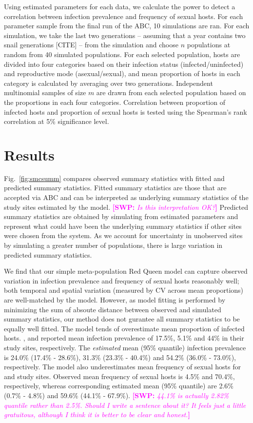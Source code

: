 \documentclass{article}\usepackage[]{graphicx}\usepackage[]{color}
\newcommand{\comment}[3]{\textcolor{#1}{\textbf{[#2: }\textit{#3}\textbf{]}}}
\newcommand{\swp}[1]{\comment{magenta}{SWP}{#1}}
\newcommand{\fref}[1]{Fig.~\ref{fig:#1}}
\begin{document}
Using estimated parameters for each data, we calculate the power to detect a correlation between infection prevalence and frequency of sexual hosts.
For each parameter sample from the final run of the ABC, 10 simulations are ran.
For each simulation, we take the last two generations -- assuming that a year contains two snail generations [CITE] -- from the simulation and choose $n$ populations at random from 40 simulated populations.
For each selected population, hosts are divided into four categories based on their infection status (infected/uninfected) and reproductive mode (asexual/sexual),
and mean proportion of hosts in each category is calculated by averaging over two generations.
Independent multinomial samples of size $m$ are drawn from each selected population based on the proportions  in each four categories. 
Correlation between proportion of infected hosts and proportion of sexual hosts is tested using the Spearman's rank correlation at 5\% significance level.

\section{Results}

\fref{smcsumm} compares observed summary statistics with fitted and predicted summary statistics.
Fitted summary statistics are those that are accepted via ABC and can be interpreted as underlying summary statistics of the study sites estimated by the model. \swp{Is this interpretation OK?}
Predicted summary statistics are obtained by simulating from estimated parameters and represent what could have been the underlying summary statistics if other sites were chosen from the system.
As we account for uncertainty in unobserved sites by simulating a greater number of populations, there is large variation in predicted summary statistics.

We find that our simple meta-population Red Queen model can capture observed variation in infection prevalence and frequency of sexual hosts reasonably well;
both temporal and spatial variation (measured by CV across mean proportions) are well-matched by the model. 
However, as model fitting is performed by minimizing the sum of absoute distance between observed and simulated summary statistics, our method does not gurantee all summary statistics to be equally well fitted.
The model tends of overestimate mean proportion of infected hosts.
\cite{dagan2013clonal}, \cite{mckone2016fine} and \cite{vergara2014infection} reported mean infection prevalence of 17.5\%, 5.1\% and 44\% in their study sites, respectively.
The \emph{estimated} mean (95\% quantile) infection prevalence is 24.0\% (17.4\% - 28.6\%), 31.3\% (23.3\% - 40.4\%) and 54.2\% (36.0\% - 73.0\%), respectively.
The model also underestimates mean frequency of sexual hosts for \cite{dagan2013clonal} and \cite{vergara2014infection} study sites.
Observed mean frequency of sexual hosts is 4.5\% and 70.4\%, respectively, whereas corresponding estimated mean (95\% quantile) are 2.6\% (0.7\% - 4.8\%) and 59.6\% (44.1\% - 67.9\%).
\swp{44.1\% is actually 2.82\% quantile rather than 2.5\%. Should I write a sentence about it? It feels just a little gratuitous, although I think it is better to be clear and honest.}
\end{document}
